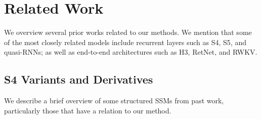\section{Related Work}
\label{sec:related}

We overview several prior works related to our methods.
We mention that some of the most closely related models include recurrent layers such as S4, S5, and quasi-RNNs;
as well as end-to-end architectures such as H3, RetNet, and RWKV.

\subsection{S4 Variants and Derivatives}

We describe a brief overview of some structured SSMs from past work, particularly those that have a relation to our method.

